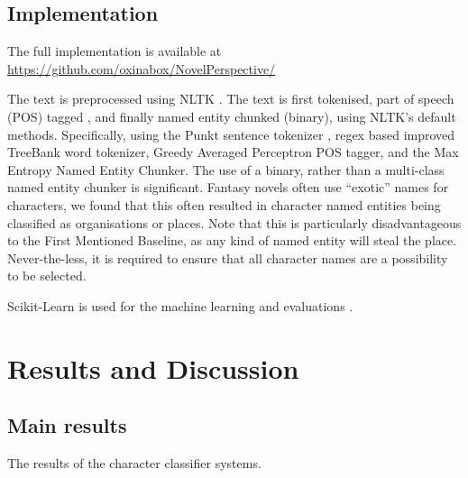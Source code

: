 \documentclass[11pt,a4paper]{article}
\newcommand{\parencite}{\citep}
\begin{document}
\subsection{Implementation}
The full implementation is available at \url{https://github.com/oxinabox/NovelPerspective/}

The text is preprocessed using NLTK \parencite{NLTK}.
The text is first tokenised, part of speech (POS) tagged , and finally named entity chunked (binary), using NLTK's default methods.
Specifically, using the Punkt sentence tokenizer \parencite{kiss2006unsupervised}, regex based improved TreeBank word tokenizer, Greedy Averaged Perceptron POS tagger, and the Max Entropy Named Entity Chunker.
The use of a binary, rather than a multi-class named entity chunker is significant.
Fantasy novels often use ``exotic'' names for characters, we found that this often resulted in character named entities being classified as organisations or places.
Note that this is particularly disadvantageous to the First Mentioned Baseline, as any kind of named entity will steal the place.
Never-the-less, it is required to ensure that all character names are a possibility to be selected.

Scikit-Learn is used for the machine learning and evaluations \parencite{scikit-learn}.

\section{Results and Discussion}\label{sec:results-and-discussion}

\subsection{Main results}

\begin{table}
	\begin{adjustbox}{max width=\columnwidth}
	\end{adjustbox}
	
	\caption{The results of the character classifier systems.} \label{tbl:resmain}
\end{table}
\end{document}
